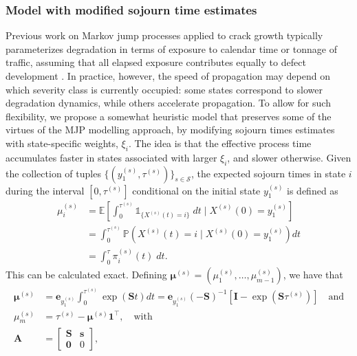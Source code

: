 \subsubsection{Model with modified sojourn time estimates} \label{sec:warping}
Previous work on Markov jump processes applied to crack growth typically parameterizes degradation in terms of exposure to calendar time or tonnage of traffic, assuming that all elapsed exposure contributes equally to defect development \citep{bisgaard2024A}. 
In practice, however, the speed of propagation may depend on which severity class is currently occupied: some states correspond to slower degradation dynamics, while others accelerate propagation.
To allow for such flexibility, we propose a somewhat heuristic model that preserves some of the virtues of the MJP modelling approach, by modifying sojourn times estimates with state-specific weights, $\xi_i$.
The idea is that the effective process time accumulates faster in states associated with larger $\xi_i$, and slower otherwise.
Given the collection of tuples $\{ ( y_1^{(s)}, \tau^{(s)} ) \}_{s \in \mathcal{S}}$, the expected sojourn times in state $i$ during the interval $\left[ 0,\tau^{(s)} \right]$ conditional on the initial state $y_1^{(s)}$ is defined as
\begin{equation*}
    \begin{aligned}
    \mu_i^{(s)} &=\mathbb{E} \left[ \left. \int_0^{\tau^{(s)}} \mathds{1}_{\{X^{(s)}(t) = i\}} \; dt \; \Big| \; X^{(s)}(0) = y_1^{(s)} \right. \right] \\ 
				&= \int_0^{\tau^{(s)}}\mathds{P}\left(X^{(s)}(t)=i \; \Big| \; X^{(s)}(0)=y_1^{(s)}\right)dt \\ 
				&= \int_0^\tau \pi^{(s)}_i(t) \; dt.
\end{aligned}  \label{eq:cumulative_sojourn_time}
\end{equation*} 
This can be calculated exact. Defining $\bm{\mu}^{(s)}  =  \left(\mu_1^{(s)},\dots,\mu_{m-1}^{(s)}\right)$, we have that
\begin{equation*}
    \begin{aligned}
\bm{\mu}^{(s)} &= \bm{e}_{y_{1}^{(s)}} \int_0^{\tau^{(s)}}\exp\left(\bm{S}t\right) dt = \bm{e}_{y_{1}^{(s)}} (-\bm{S})^{-1}\left[\bm{I} - \exp \left( \bm{S}\tau^{(s)} \right) \right] \quad \text{and} \\ 
\mu_m^{(s)}  &= \tau^{(s)} - \bm{\mu}^{(s)}\bm{1}^\top, \quad \text{with} \\
\bm{A} &= \left[\begin{array}{cc} \bm{S} & \bm{s} \\
\bm{0} & 0\end{array}\right], 
    \end{aligned} 
\end{equation*}
